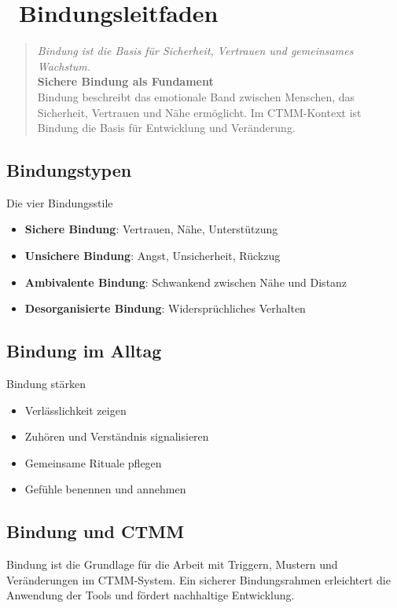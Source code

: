 
\newpage
\section*{\textcolor{ctmmBlue}{\faHeart~Bindungsleitfaden}}

\begin{quote}
\textit{\textcolor{ctmmOrange}{Bindung ist die Basis für Sicherheit, Vertrauen und gemeinsames Wachstum.}}\\
\textbf{\textcolor{ctmmBlue}{Sichere Bindung als Fundament}}\\
Bindung beschreibt das emotionale Band zwischen Menschen, das Sicherheit, Vertrauen und Nähe ermöglicht. Im CTMM-Kontext ist Bindung die Basis für Entwicklung und Veränderung.
\end{quote}

\subsection*{\textcolor{ctmmBlue}{Bindungstypen}}

\begin{ctmmBlueBox}{Die vier Bindungsstile}
\begin{itemize}
  \item \textbf{Sichere Bindung}: Vertrauen, Nähe, Unterstützung
  \item \textbf{Unsichere Bindung}: Angst, Unsicherheit, Rückzug
  \item \textbf{Ambivalente Bindung}: Schwankend zwischen Nähe und Distanz
  \item \textbf{Desorganisierte Bindung}: Widersprüchliches Verhalten
\end{itemize}
\end{ctmmBlueBox}

\subsection*{\textcolor{ctmmBlue}{Bindung im Alltag}}

\begin{ctmmGreenBox}{Bindung stärken}
\begin{itemize}
  \item Verlässlichkeit zeigen
  \item Zuhören und Verständnis signalisieren
  \item Gemeinsame Rituale pflegen
  \item Gefühle benennen und annehmen
\end{itemize}
\end{ctmmGreenBox}

\subsection*{\textcolor{ctmmBlue}{Bindung und CTMM}}
Bindung ist die Grundlage für die Arbeit mit Triggern, Mustern und Veränderungen im CTMM-System. Ein sicherer Bindungsrahmen erleichtert die Anwendung der Tools und fördert nachhaltige Entwicklung.
